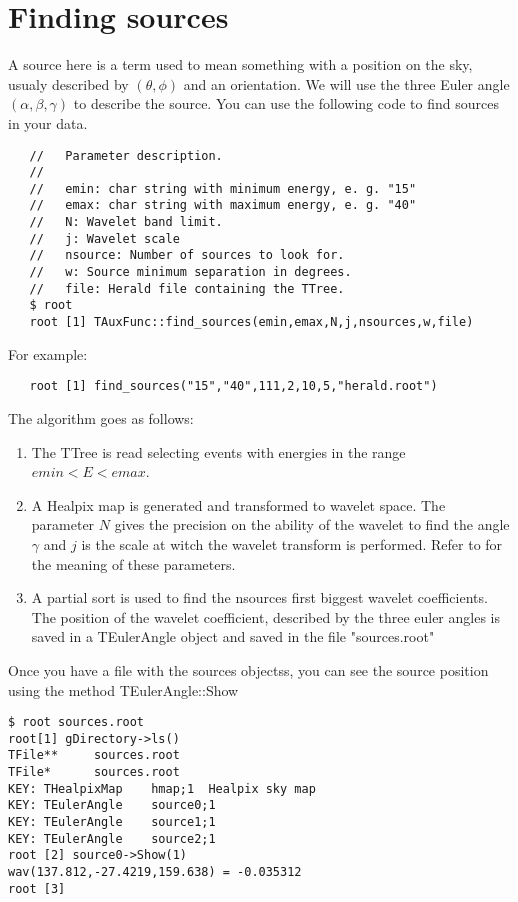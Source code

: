 \documentclass[12pt]{report}
\begin{document}
\section{Finding sources}

A source here is a term used to mean something with a position on the sky, usualy described
by $(\theta,\phi)$ and an orientation. We will use the three Euler angle $(\alpha,\beta,\gamma)$ to
describe the source. You can use the following code to find sources in your data.
{ \color{brown}
   \begin{lstlisting}
   //   Parameter description.
   //
   //   emin: char string with minimum energy, e. g. "15"
   //   emax: char string with maximum energy, e. g. "40"
   //   N: Wavelet band limit.                           
   //   j: Wavelet scale                                 
   //   nsource: Number of sources to look for.          
   //   w: Source minimum separation in degrees.         
   //   file: Herald file containing the TTree.          
   $ root
   root [1] TAuxFunc::find_sources(emin,emax,N,j,nsources,w,file)
   \end{lstlisting}
}
For example:
{ \color{brown}
   \begin{lstlisting}
   root [1] find_sources("15","40",111,2,10,5,"herald.root")
   \end{lstlisting}
}

The algorithm goes as follows:
\begin{enumerate}
\item The TTree is read selecting events with energies in the range $emin < E < emax$.
\item A Healpix map is generated and transformed to wavelet space. The parameter $N$
gives the precision on the ability of the wavelet to find the angle $\gamma$ and $j$
is the scale at witch the wavelet transform is performed. Refer to \cite{gap} for
the meaning of these parameters.
\item A partial sort is used to find the nsources first biggest wavelet coefficients.
The position of the wavelet coefficient, described by the three euler angles is
saved in a TEulerAngle object and saved in the file {\color{brown}"sources.root"}
\end{enumerate}
Once you have a file with the sources objectss, you can see the source position using
the method {\color{brown}TEulerAngle::Show}
{ \color{brown}
\begin{lstlisting}
$ root sources.root
root[1] gDirectory->ls()
TFile**		sources.root	
TFile*		sources.root	
KEY: THealpixMap	hmap;1	Healpix sky map
KEY: TEulerAngle	source0;1	
KEY: TEulerAngle	source1;1	
KEY: TEulerAngle	source2;1	
root [2] source0->Show(1)
wav(137.812,-27.4219,159.638) = -0.035312
root [3] 
\end{lstlisting}
}
\end{document}
